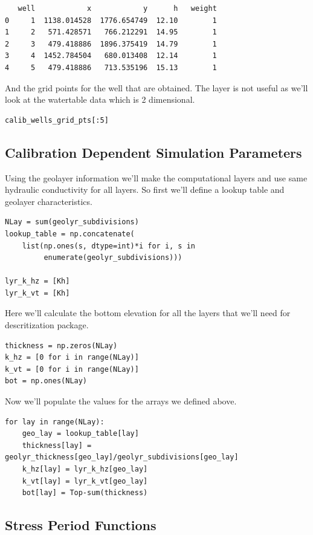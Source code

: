 \documentclass[titlepage,12pt]{unisubmission}
\begin{document}
\begin{verbatim}
   well            x            y      h   weight
0     1  1138.014528  1776.654749  12.10        1
1     2   571.428571   766.212291  14.95        1
2     3   479.418886  1896.375419  14.79        1
3     4  1452.784504   680.013408  12.14        1
4     5   479.418886   713.535196  15.13        1
\end{verbatim}

And the grid points for the well that are obtained. The layer is not useful as we'll look at the watertable data which is 2 dimensional.

\begin{verbatim}
calib_wells_grid_pts[:5]
\end{verbatim}

\subsection{Calibration Dependent Simulation Parameters}
\label{sec:orgd11f07a}
Using the geolayer information we'll make the computational layers and use same hydraulic conductivity for all layers. So first we'll define a lookup table and geolayer characteristics.

\begin{verbatim}
NLay = sum(geolyr_subdivisions)
lookup_table = np.concatenate(
    list(np.ones(s, dtype=int)*i for i, s in
         enumerate(geolyr_subdivisions)))

lyr_k_hz = [Kh]
lyr_k_vt = [Kh]
\end{verbatim}

Here we'll calculate the bottom elevation for all the layers that we'll need for descritization package.

\begin{verbatim}
thickness = np.zeros(NLay)
k_hz = [0 for i in range(NLay)]
k_vt = [0 for i in range(NLay)]
bot = np.ones(NLay)
\end{verbatim}

Now we'll populate the values for the arrays we defined above.

\begin{verbatim}
for lay in range(NLay):
    geo_lay = lookup_table[lay]
    thickness[lay] = geolyr_thickness[geo_lay]/geolyr_subdivisions[geo_lay]
    k_hz[lay] = lyr_k_hz[geo_lay]
    k_vt[lay] = lyr_k_vt[geo_lay]
    bot[lay] = Top-sum(thickness)
\end{verbatim}

\subsection{Stress Period Functions}
\label{sec:orge8882c9}
\end{document}
